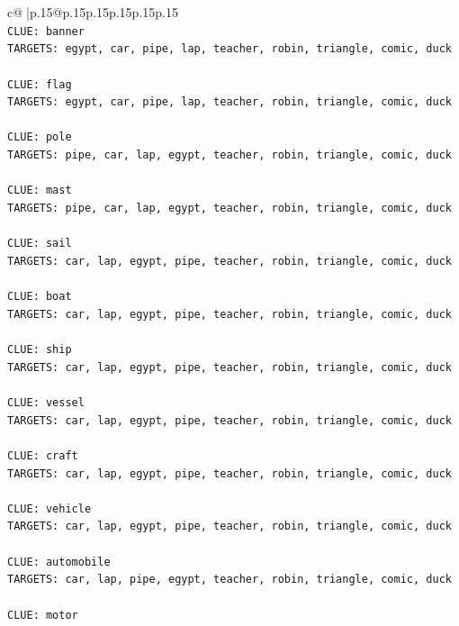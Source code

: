 \documentclass{article}
\begin{document}
{\begin{supertabular}{c@{$\;$}|p{.15\linewidth}@{}p{.15\linewidth}p{.15\linewidth}p{.15\linewidth}p{.15\linewidth}p{.15\linewidth}}
{{{\\ 
\texttt{CLUE: banner} \\
\texttt{TARGETS: egypt, car, pipe, lap, teacher, robin, triangle, comic, duck} \\
\\ 
\texttt{CLUE: flag} \\
\texttt{TARGETS: egypt, car, pipe, lap, teacher, robin, triangle, comic, duck} \\
\\ 
\texttt{CLUE: pole} \\
\texttt{TARGETS: pipe, car, lap, egypt, teacher, robin, triangle, comic, duck} \\
\\ 
\texttt{CLUE: mast} \\
\texttt{TARGETS: pipe, car, lap, egypt, teacher, robin, triangle, comic, duck} \\
\\ 
\texttt{CLUE: sail} \\
\texttt{TARGETS: car, lap, egypt, pipe, teacher, robin, triangle, comic, duck} \\
\\ 
\texttt{CLUE: boat} \\
\texttt{TARGETS: car, lap, egypt, pipe, teacher, robin, triangle, comic, duck} \\
\\ 
\texttt{CLUE: ship} \\
\texttt{TARGETS: car, lap, egypt, pipe, teacher, robin, triangle, comic, duck} \\
\\ 
\texttt{CLUE: vessel} \\
\texttt{TARGETS: car, lap, egypt, pipe, teacher, robin, triangle, comic, duck} \\
\\ 
\texttt{CLUE: craft} \\
\texttt{TARGETS: car, lap, egypt, pipe, teacher, robin, triangle, comic, duck} \\
\\ 
\texttt{CLUE: vehicle} \\
\texttt{TARGETS: car, lap, egypt, pipe, teacher, robin, triangle, comic, duck} \\
\\ 
\texttt{CLUE: automobile} \\
\texttt{TARGETS: car, lap, pipe, egypt, teacher, robin, triangle, comic, duck} \\
\\ 
\texttt{CLUE: motor} \\
}}}
\end{supertabular}}
\end{document}
